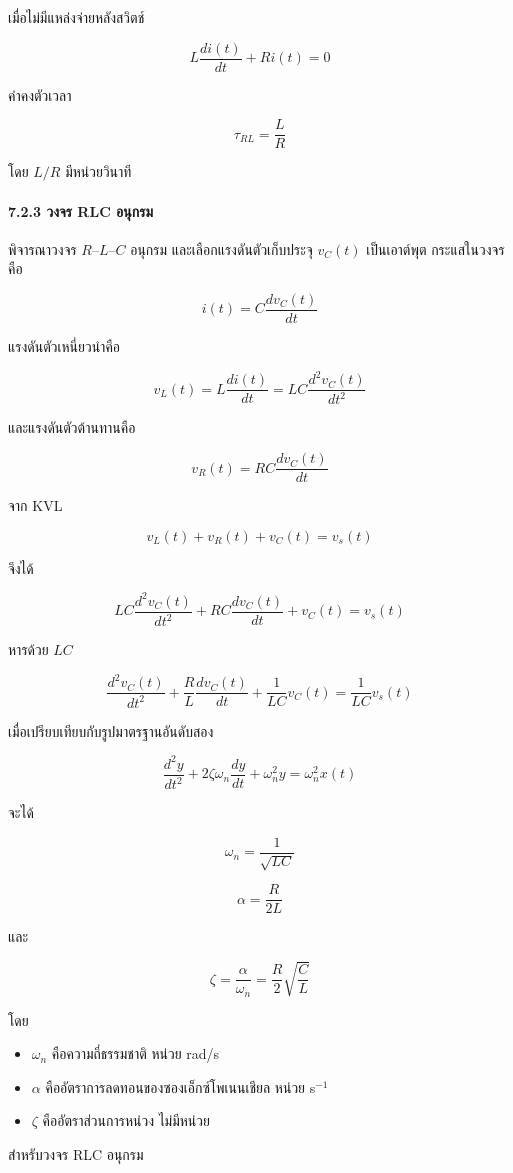 เมื่อไม่มีแหล่งจ่ายหลังสวิตช์

\[
L\frac{di(t)}{dt}+Ri(t)=0
\]

ค่าคงตัวเวลา

\[
\tau_{RL}=\frac{L}{R}
\]

โดย $L/R$ มีหน่วยวินาที

\paragraph{7.2.3 วงจร RLC อนุกรม}

พิจารณาวงจร $R$–$L$–$C$ อนุกรม และเลือกแรงดันตัวเก็บประจุ $v_C(t)$ เป็นเอาต์พุต กระแสในวงจรคือ

\[
i(t)=C\frac{dv_C(t)}{dt}
\]

แรงดันตัวเหนี่ยวนำคือ

\[
v_L(t)=L\frac{di(t)}{dt}=LC\frac{d^2v_C(t)}{dt^2}
\]

และแรงดันตัวต้านทานคือ

\[
v_R(t)=RC\frac{dv_C(t)}{dt}
\]

จาก KVL

\[
v_L(t)+v_R(t)+v_C(t)=v_s(t)
\]

จึงได้

\[
LC\frac{d^2v_C(t)}{dt^2}+RC\frac{dv_C(t)}{dt}+v_C(t)=v_s(t)
\]

หารด้วย $LC$

\[
\frac{d^2v_C(t)}{dt^2}+\frac{R}{L}\frac{dv_C(t)}{dt}+\frac{1}{LC}v_C(t)=\frac{1}{LC}v_s(t)
\]

เมื่อเปรียบเทียบกับรูปมาตรฐานอันดับสอง

\[
\frac{d^2y}{dt^2}+2\zeta\omega_n\frac{dy}{dt}+\omega_n^2y=\omega_n^2x(t)
\]

จะได้

\[
\omega_n=\frac{1}{\sqrt{LC}}
\]

\[
\alpha=\frac{R}{2L}
\]

และ

\[
\zeta=\frac{\alpha}{\omega_n}=\frac{R}{2}\sqrt{\frac{C}{L}}
\]

โดย

\begin{itemize}
    \item $\omega_n$ คือความถี่ธรรมชาติ หน่วย rad/s
    \item $\alpha$ คืออัตราการลดทอนของซองเอ็กซ์โพเนนเชียล หน่วย s$^{-1}$
    \item $\zeta$ คืออัตราส่วนการหน่วง ไม่มีหน่วย
\end{itemize}

สำหรับวงจร RLC อนุกรม

